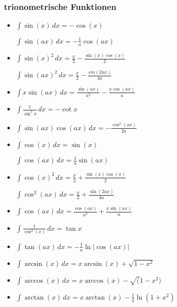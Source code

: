 \subsubsection{trionometrische Funktionen}
\begin{itemize}[leftmargin=*]
	\item
	\begin{minipage}{0.5\columnwidth}
		$\int \sin(x) \, dx = - \cos(x)$
	\end{minipage}
	\begin{minipage}{0.45\columnwidth}
		$\int \sin(ax) \,dx = -\frac{1}{a}\cos(ax)$
	\end{minipage}

	\item
	\begin{minipage}{0.5\columnwidth}
		 $\int \sin(x)^2 \, dx = \frac{x}{2} - \frac{\sin(x) \cos(x)}{2}$
	\end{minipage}
	\begin{minipage}{0.45\columnwidth}
		$\int \sin(ax)^2 \,dx = \frac{x}{2} - \frac{sin(2ax)}{4a}$
	\end{minipage}
		  
	\item $\int x \sin(ax) \,dx = \frac{\sin(ax)}{a^2} - \frac{x \cos(ax)}{a}$
	\item $\int \frac{1}{\sin^2 x} \,dx = -\cot x$
   	\item $\int \sin(ax) \cos(ax) \,dx = -\frac{\cos^2(ax)}{2a}$

   	\item 
	\begin{minipage}{0.5\columnwidth}
		$\int \cos(x) \, dx = \sin(x)$
	\end{minipage}
	\begin{minipage}{0.45\columnwidth}
		$\int \cos(ax) \,dx = \frac{1}{a}\sin(ax)$
	\end{minipage}

	\item
	\begin{minipage}{0.5\columnwidth}
		$\int \cos(x)^2 \, dx = \frac{x}{2} + \frac{\sin(x) \cos(x)}{2}$
	\end{minipage}
	\begin{minipage}{0.45\columnwidth}
		$\int \cos^2(ax) \,dx = \frac{x}{2} + \frac{\sin(2ax)}{4a}$
	\end{minipage}
		  
	\item $\int \cos(ax) \,dx = \frac{\cos(ax)}{a^2} + \frac{x \sin(ax)}{a}$
	\item $\int \frac{1}{\cos^2(x)} \,dx = \tan x$
	
	\item $\int \tan(ax) \,dx = - \frac{1}{a} \ln | \cos(ax) |$
	\item $\int \arcsin(x) \,dx = x \arcsin(x) + \sqrt{1 - x^2}$
	\item $\int \arccos(x) \,dx = x \arccos(x) - \sqrt(1-x^2)$
	\item $\int \arctan(x) \,dx = x \arctan(x) - \frac{1}{2} \ln(1+x^2)$
\end{itemize}

